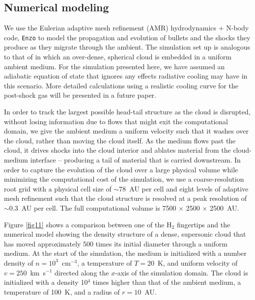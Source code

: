 \documentclass{aa}
\begin{document}
\subsection{Numerical modeling}

We use the Eulerian adaptive mesh refinement (AMR) hydrodynamics + N-body 
code,  \texttt{Enzo} \citep{Bryan2014} to model the propagation and evolution 
of bullets and the shocks they produce as they migrate through the ambient.  
The simulation set up is analogous to that of  \citet{Silvia2010, Silvia2012}  in 
which an over-dense, spherical cloud is embedded in a uniform ambient medium.  
For the simulation presented here, we have assumed an adiabatic equation of 
state that ignores any effects radiative cooling may have in this scenario.  
More detailed calculations using a realistic cooling curve for the post-shock 
gas will be presented in a future paper.

In order to track the largest possible head-tail structure as the cloud is disrupted, 
without losing information due to flows that might exit the computational domain, 
we give the ambient medium a uniform velocity such that it washes over the cloud, 
rather than moving the cloud itself.  As the medium flows past the cloud, it drives 
shocks into the cloud interior and ablates material from the cloud-medium 
interface -- producing a tail of material that is carried downstream.  In order to 
capture the evolution of the cloud over a large physical volume while minimizing 
the computational cost of the simulation, we use a coarse-resolution root grid with 
a physical cell size of $\sim$78~AU per cell and eight levels of adaptive mesh 
refinement such that the cloud structure is resolved at a peak resolution of 
$\sim$0.3~AU per cell.  The full computational volume is 7500 
$\times$ 2500 $\times$ 2500~AU.

Figure \ref{fig11} shows a comparison between one of the H$_2$ fingertips and the 
numerical model showing the density structure of a dense, supersonic cloud 
that  has moved approximately 500 
times its initial diameter through a uniform medium.   At the start of the simulation, 
the medium is initialized with a number density of $n = 10^3$~cm$^{-3}$, a 
temperature of $T = 20$~K, and uniform velocity of $v = 250$~km~s$^{-1}$ 
directed along the $x$-axis of the simulation domain.  The cloud is initialized 
with a density 10$^4$ times higher than that of the ambient medium, a
temperature of 100~K, and a radius of $r = 10$~AU.
\end{document}
